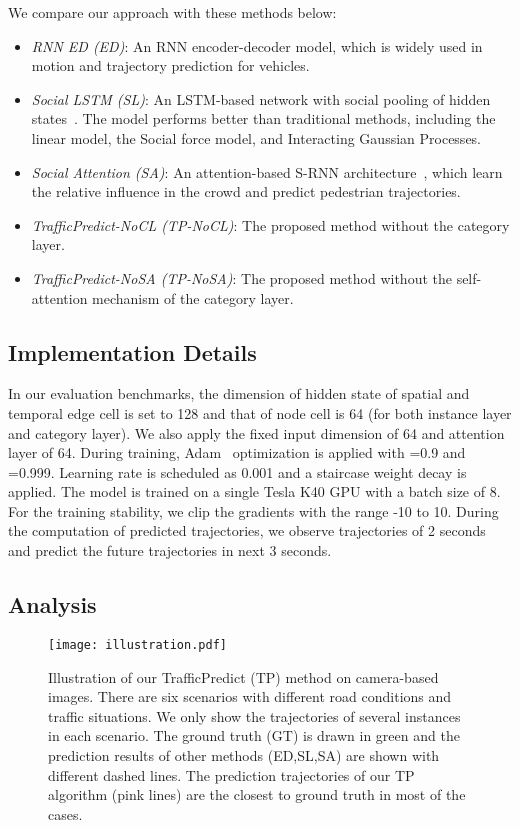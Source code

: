 \documentclass[letterpaper]{article} \usepackage{aaai19}  \usepackage{times}  \usepackage{helvet}  \usepackage{courier}  \usepackage{url}  \usepackage{graphicx}  \usepackage{amsmath}
\begin{document}
We compare our approach with these methods below:
\begin{itemize}
\item {\textit{RNN ED (ED)}: An RNN encoder-decoder model, which is widely used in motion and trajectory prediction for vehicles.}
\item {\textit{Social LSTM (SL)}: An LSTM-based network with social pooling of hidden states~\cite{alahi2016social}. The model performs better than traditional methods, including the linear model, the Social force model, and Interacting Gaussian Processes.}
\item {\textit{Social Attention (SA)}: An attention-based S-RNN architecture~\cite{vemula2017social}, which learn the relative influence in the crowd and predict pedestrian trajectories. }
\item {\textit{TrafficPredict-NoCL (TP-NoCL)}: The proposed method without the category layer.}
\item {\textit{TrafficPredict-NoSA (TP-NoSA)}: The proposed method without the self-attention mechanism of the category layer.}
\end{itemize}

\subsection{Implementation Details}
In our evaluation benchmarks, the dimension of hidden state of spatial and temporal edge cell is set to 128 and that of node cell is 64 (for both instance layer and category layer). We also apply the fixed input dimension of 64 and attention layer of 64. During training, Adam~\cite{adam} optimization is applied with =0.9 and =0.999. Learning rate is scheduled as 0.001 and a staircase weight decay is applied. The model is trained on a single Tesla K40 GPU with a batch size of 8. For the training stability, we clip the gradients with the range -10 to 10. During  the computation of predicted trajectories, we observe trajectories of 2 seconds and predict the future trajectories in next 3 seconds. 



\subsection{Analysis}

\begin{figure*}
\texttt{[image: illustration.pdf]}
\caption{Illustration of our TrafficPredict (TP) method on camera-based images. There are six scenarios with different road conditions and traffic situations. We only show the trajectories of several instances in each scenario. The ground truth (GT) is drawn in green and the prediction results of other  methods (ED,SL,SA) are shown with different dashed lines. The prediction trajectories of our TP algorithm (pink lines) are the closest to ground truth in most of the cases.}
\label{fig:result1}
\vspace{-3ex}
\end{figure*}
\end{document}

